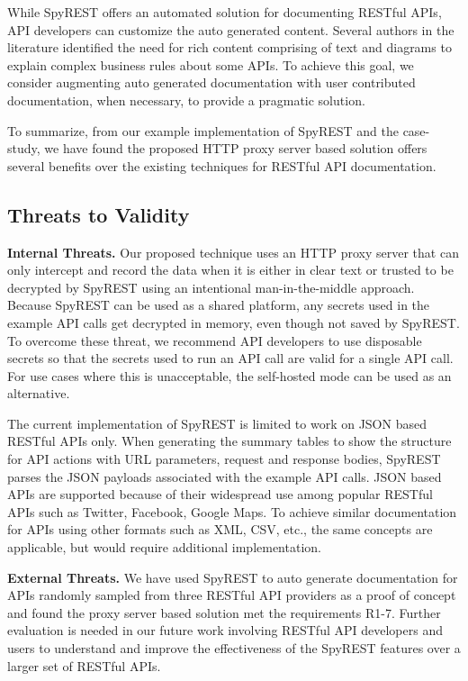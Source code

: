 \documentclass[conference]{IEEEtran}
\begin{document}
While SpyREST offers an automated solution for documenting RESTful APIs, API developers can customize the auto generated content. Several authors in the literature identified the need for rich content comprising of text and diagrams to explain complex business rules about some APIs. To achieve this goal, we consider augmenting auto generated documentation with user contributed documentation, when necessary, to provide a pragmatic solution.

To summarize, from our example implementation of SpyREST and the case-study, we have found the proposed HTTP proxy server based solution offers several benefits over the existing techniques for RESTful API documentation.

\subsection{Threats to Validity} %
\label{sub:threats_to_validity}

\textbf{Internal Threats.} Our proposed technique uses an HTTP proxy server that can only intercept and record the data when it is either in clear text or trusted to be decrypted by SpyREST using an intentional man-in-the-middle approach. Because SpyREST can be used as a shared platform, any secrets used in the example API calls get decrypted in memory, even though not saved by SpyREST. To overcome these threat, we recommend API developers to use disposable secrets so that the secrets used to run an API call are valid for a single API call. For use cases where this is unacceptable, the self-hosted mode can be used as an alternative.

The current implementation of SpyREST is limited to work on JSON based RESTful APIs only. When generating the summary tables to show the structure for API actions with URL parameters, request and response bodies, SpyREST parses the JSON payloads associated with the example API calls. JSON based APIs are supported because of their widespread use among popular RESTful APIs such as Twitter, Facebook, Google Maps. To achieve similar documentation for APIs using other formats such as XML, CSV, etc., the same concepts are applicable, but would require additional implementation.

\textbf{External Threats.}  We have used SpyREST to auto generate documentation for APIs randomly sampled from three RESTful API providers as a proof of concept and found the proxy server based solution met the requirements R1-7. Further evaluation is needed in our future work involving RESTful API developers and users to understand and improve the effectiveness of the SpyREST features over a larger set of RESTful APIs.
\end{document}
